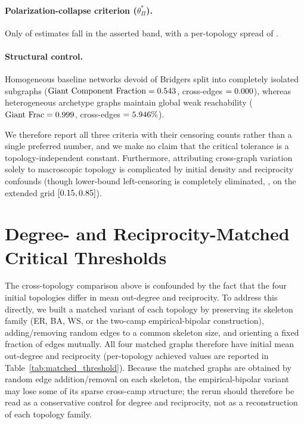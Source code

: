 \paragraph{Polarization-collapse criterion ($\theta^*_{\Pi}$).} Only \ThresholdPolInBand{}
of \ThresholdPolEstimates{} estimates fall in the asserted band, with a per-topology spread
of \ThresholdPolSpread.

\paragraph{Structural control.} Homogeneous baseline networks devoid of Bridgers split into
completely isolated subgraphs ($\text{Giant Component Fraction} = 0.543$,
cross-edges $= 0.000$), whereas heterogeneous archetype graphs maintain
global weak reachability ($\text{Giant Frac} = 0.999$, cross-edges $= 5.946\%$).

We therefore report all three criteria with their censoring counts rather than a single
preferred number, and we make no claim that the critical tolerance is a topology-independent
constant. Furthermore, attributing cross-graph variation solely to macroscopic topology is
complicated by initial density and reciprocity confounds (though lower-bound left-censoring is completely eliminated, \ThresholdFragLeftCensoredFrac, on the extended grid $[0.15, 0.85]$).

\section{Degree- and Reciprocity-Matched Critical Thresholds}
\label{app:threshold-matched}

The cross-topology comparison above is confounded by the fact that the four initial
topologies differ in mean out-degree and reciprocity. To address this directly, we built a
matched variant of each topology by preserving its skeleton family (ER, BA, WS, or the
two-camp empirical-bipolar construction), adding/removing random edges to a common skeleton
size, and orienting a fixed fraction of edges mutually. All four matched graphs therefore
have initial mean out-degree \MatchedTargetDegree{} and reciprocity
\MatchedTargetReciprocity{} (per-topology achieved values are reported in
Table~\ref{tab:matched_threshold}). Because the matched graphs are obtained by random edge
addition/removal on each skeleton, the empirical-bipolar variant may lose some of its sparse
cross-camp structure; the rerun should therefore be read as a conservative control for
degree and reciprocity, not as a reconstruction of each topology family.

